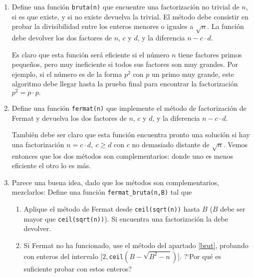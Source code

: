 \begin{ejer}
  \begin{enumerate}
   \item\label{brut}  {\sc Define una funci\'on} {\tt bruta(n)} que
encuentre una factorizaci\'on no trivial de $n$, si es que existe, y si no
existe devuelva la trivial.  El m\'etodo debe consistir en  probar la
divisibilidad entre los enteros menores o iguales a $\sqrt{n}.$  La funci\'on
debe devolver los dos factores de $n$, $c$ y $d$,  y la diferencia $n-c\cdot d$.

{\sc Es claro}  que esta funci\'on ser\'a eficiente si el n\'umero $n$ tiene
factores primos peque\~nos, pero muy ineficiente si todos sus  factores son muy
grandes.  Por ejemplo, si el n\'umero es de la forma $p^2$ con $p$ un primo muy
grande, este algoritmo debe llegar hasta la prueba final para encontrar la
factorizaci\'on $p^2=p\cdot p.$
  
 \item   {\sc Define una funci\'on} {\tt fermat(n)} que implemente el
m\'etodo de factorizaci\'on de Fermat y devuelva los dos
factores de $n$, $c$ y $d$, y la diferencia $n-c\cdot d$.
  
  {\sc Tambi\'en debe ser claro}  que esta funci\'on encuentra  pronto una
soluci\'on si hay una factorizaci\'on $n=c\cdot d,\ c\ge d$ con $c$ no demasiado
distante de $\sqrt{n}.$ {\sc Vemos entonces} que los dos m\'etodos son
complementarios: donde uno es menos eficiente el otro lo es m\'as. 
 \begin{comment}
 \item  (1 punto) {\sc Modifica la funci\'on} {\tt fermat(n)}, definiendo una
variante {\tt fermat2(n)}, que muestre ({\tt print}) todas las ``casi
soluciones'', $c,d$, determinadas por $x$ enteros crecientes, empezando en {\tt
ceil(sqrt(n))},  con el correspondiente   $y:=\sqrt{x^2-n}$ no entero. 
  
 Ejecuta tu programa ************** ?`Qu\'e observas?
 \end{comment}
 
 \item  Parece una buena idea, dado que los m\'etodos son
complementarios,  mezclarlos: 
 {\sc Define una funci\'on} {\tt fermat\_bruta(n,B)} tal que 
 \begin{enumerate}
 \item Aplique el m\'etodo de Fermat desde {\tt ceil(sqrt(n))} hasta $B$ ($B$
debe ser mayor que {\tt ceil(sqrt(n))}). Si encuentra una factorizaci\'on la
debe devolver.
 \item Si Fermat no ha funcionado, use el m\'etodo del apartado \ref{brut},
probando con enteros del intervalo 
$[2,$\lstinline|ceil|$(B-\sqrt{B^2-n})]$. ?`Por qu\'e es
suficiente probar con estos enteros?
 \end{enumerate}
 

\end{enumerate}
\end{ejer}
